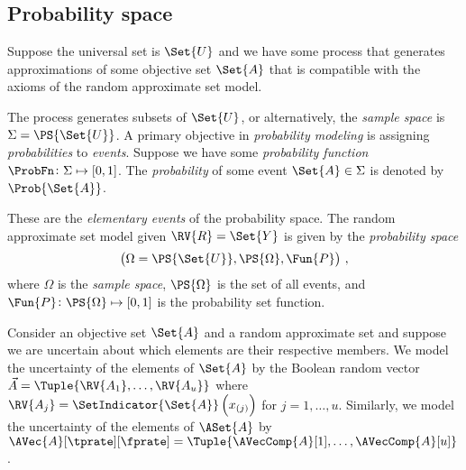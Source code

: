 \documentclass[ ../main.tex]{subfiles}
\begin{document}
\subsection{Probability space}
\label{sec:prob_model}
Suppose the universal set is $\Set{U}$ and we have some process that generates approximations of some objective set $\Set{A}$ that is compatible with the axioms of the random approximate set model.


The process generates subsets of $\Set{U}$, or alternatively, the \emph{sample space} is $\Sigma = \PS{\Set{U}}$.
A primary objective in \emph{probability modeling} is assigning \emph{probabilities} to \emph{events}.
Suppose we have some \emph{probability function} $\ProbFn \colon \Sigma \mapsto [0,1]$.
The \emph{probability} of some event $\Set{A} \in \Sigma$ is denoted by $\Prob{\Set{A}}$.


These are the \emph{elementary events} of the probability space.
The random approximate set model given $\RV{R} = \Set{Y}$ is given by the \emph{probability space}
\begin{equation}
\left(\Omega = \PS{\Set{U}}, \PS{\Omega}, \Fun{P}\right)\,,
\end{equation}
where $\Omega$ is the \emph{sample space}, $\PS{\Omega}$ is the set of all events, and $\Fun{P} \colon \PS{\Omega} \mapsto [0,1]$ is the probability set function.




Consider an objective set $\Set{A}$ and a random approximate set  and suppose we are uncertain about which elements are their respective members.
We model the uncertainty of the elements of $\Set{A}$ by the Boolean random vector $\vec{A} = \Tuple{\RV{A_1},\ldots,\RV{A_u}}$ where $\RV{A_j} = \SetIndicator{\Set{A}}\left(x_{(j)}\right)$ for $j=1,\ldots,u$.
Similarly, we model the uncertainty of the elements of $\ASet{A}$ by $\AVec{A}[\tprate][\fprate] = \Tuple{\AVecComp{A}[1],\ldots,\AVecComp{A}[u]}$.
\end{document}
